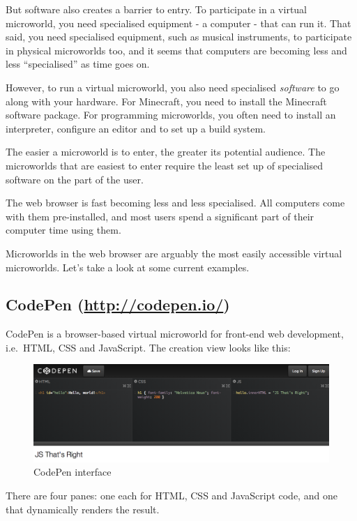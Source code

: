But software also creates a barrier to entry. To participate in a
virtual microworld, you need specialised equipment - a computer - that
can run it. That said, you need specialised equipment, such as musical
instruments, to participate in physical microworlds too, and it seems
that computers are becoming less and less ``specialised'' as time goes
on.

However, to run a virtual microworld, you also need specialised
\emph{software} to go along with your hardware. For Minecraft, you need
to install the Minecraft software package. For programming microworlds,
you often need to install an interpreter, configure an editor and to set
up a build system.

The easier a microworld is to enter, the greater its potential audience.
The microworlds that are easiest to enter require the least set up of
specialised software on the part of the user.

The web browser is fast becoming less and less specialised. All
computers come with them pre-installed, and most users spend a
significant part of their computer time using them.

Microworlds in the web browser are arguably the most easily accessible
virtual microworlds. Let's take a look at some current examples.

\subsection{CodePen (\href{http://codepen.io/}{http://codepen.io/})}

CodePen is a browser-based virtual microworld for front-end web
development, i.e.~HTML, CSS and JavaScript. The creation view looks like
this:

\begin{figure}[ht!]
\centering
\includegraphics[width=123mm]{img/codepen.png}
\caption{CodePen interface}
\label{overflow}
\end{figure}

There are four panes: one each for HTML, CSS and JavaScript code, and
one that dynamically renders the result.

